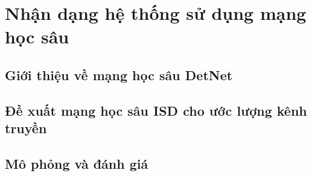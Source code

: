 \clearpage
{}

\setcounter{chapter}{2}
\chapter[NHẬN DẠNG HỆ THỐNG SỬ DỤNG MẠNG HỌC SÂU]{Nhận dạng hệ thống sử dụng mạng học sâu}

\section{Giới thiệu về mạng học sâu DetNet}

\section{Đề xuất mạng học sâu ISD cho ước lượng kênh truyền}

\section{Mô phỏng và đánh giá}